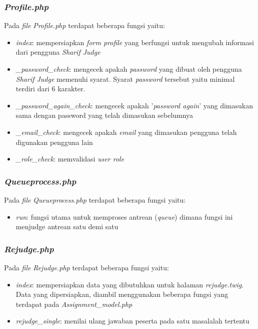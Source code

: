\subsubsection{\textit{Profile.php}}
Pada \textit{file} \textit{Profile.php} terdapat beberapa fungsi yaitu:
\begin{itemize}
	\item \textit{index}: mempersiapkan \textit{form profile} yang berfungsi untuk mengubah informasi dari pengguna \textit{Sharif Judge}
	\item \textit{\_password\_check}: mengecek apakah \textit{password} yang dibuat oleh pengguna \textit{Sharif Judge} memenuhi syarat. Syarat \textit{password} tersebut yaitu minimal terdiri dari 6 karakter.
	\item \textit{\_password\_again\_check}: mengecek apakah '\textit{password again}' yang dimasukan sama dengan password yang telah dimasukan sebelumnya
	\item \textit{\_email\_check}: mengecek apakah \textit{email} yang dimasukan pengguna telah digunakan pengguna lain
	\item \textit{\_role\_check}: memvalidasi \textit{user role}
\end{itemize}

\subsubsection{\textit{Queueprocess.php}}
Pada \textit{file} \textit{Queueprocess.php} terdapat beberapa fungsi yaitu:
\begin{itemize}
	\item \textit{run}: fungsi utama untuk memproses antrean (\textit{queue}) dimana fungsi ini menjudge antrean satu demi satu
\end{itemize}

\subsubsection{\textit{Rejudge.php}}
Pada \textit{file} \textit{Rejudge.php} terdapat beberapa fungsi yaitu:
\begin{itemize}
	\item \textit{index}: mempersiapkan data yang dibutuhkan untuk halaman \textit{rejudge.twig}. Data yang dipersiapkan, diambil menggunakan beberapa fungsi yang terdapat pada \textit{Assignment\_model.php}
	\item \textit{rejudge\_single}: menilai ulang jawaban peserta pada satu masalalah tertentu
\end{itemize}

